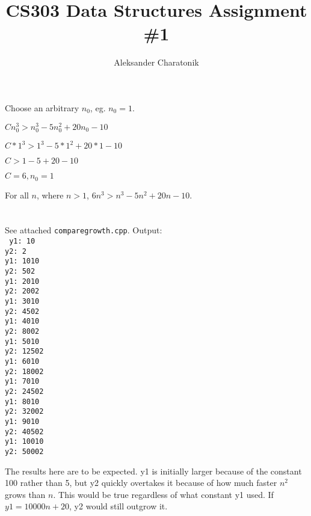\documentclass[12pt]{article}
\title{CS303 Data Structures Assignment \#1}
\author{Aleksander Charatonik}
\begin{document}
\maketitle

\section{}
{\small
Choose an arbitrary \(n_0\), eg. \(n_0=1\).

\(Cn_0^3>n_0^3-5n_0^2+20n_0-10\)

\(C*1^3>1^3-5*1^2+20*1-10\)

\(C>1-5+20-10\)

\(C=6, n_0=1\)\\
}
For all \(n\), where \(n>1\), \(6n^3>n^3-5n^2+20n-10\).\\

\section{}
See attached \texttt{comparegrowth.cpp}. Output:\\
\texttt{
y1: 10\\
y2: 2\\
y1: 1010\\
y2: 502\\
y1: 2010\\
y2: 2002\\
y1: 3010\\
y2: 4502\\
y1: 4010\\
y2: 8002\\
y1: 5010\\
y2: 12502\\
y1: 6010\\
y2: 18002\\
y1: 7010\\
y2: 24502\\
y1: 8010\\
y2: 32002\\
y1: 9010\\
y2: 40502\\
y1: 10010\\
y2: 50002\\
}

The results here are to be expected. y1 is initially larger because of the constant 100 rather than 5, but y2 quickly overtakes it because of how much faster \(n^2\) grows than \(n\). This would be true regardless of what constant y1 used. If \(y1=10000n +20\), y2 would still outgrow it.\\
\end{document}
